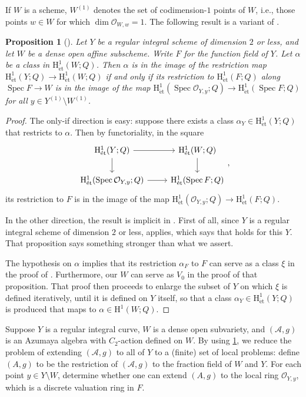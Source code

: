 \documentclass[reqno,oneside,dvipsnames,pdfnames,final]{amsart}
\newtheorem{prop}[thm]{Proposition}
\theoremstyle{definition}
\DeclareMathOperator{\Spec}{Spec}
\newcommand{\et}{\mathrm{\acute et}}
\newcommand{\sh}[1]{\mathcal{#1}}
\newcommand{\Hoh}{\mathrm{H}}
\newcommand{\sm}{\setminus}
\begin{document}
If $W$ is a scheme, $W^{(1)}$ denotes the set of codimension-$1$ points of $W$, i.e., those points $w \in W$ for which $\dim \sh O_{W,w}=1$. The following result is a variant of \cite[Cor.\ 6.14]{Colliot-Thelene1979}.



\begin{prop}[{\cite{Colliot-Thelene1979}}]\label{pr:CTS}
  Let $Y$ be a regular integral scheme of dimension $2$ or less, and let $W$ be a dense open affine subscheme. Write $F$ for the function field of $Y$. Let $\alpha$ be a class in $\Hoh^1_\et(W; Q)$. Then $\alpha$ is in the image of the restriction map $\Hoh^1_\et(Y; Q) \to \Hoh^1_\et(W; Q)$ if and only if its restriction to $\Hoh^1_\et(F; Q)$ along $\Spec F \to W$ is in the image of the map $\Hoh^1_\et(\Spec \sh O_{Y,y}; Q)  \to \Hoh^1_\et(\Spec F; Q)$ for all $y \in Y^{(1)}\sm W^{(1)}$.
\end{prop}
\begin{proof}
  The only-if direction is easy: suppose there exists a class $\alpha_Y \in \Hoh^1_\et(Y; Q)$ that restricts to $\alpha$. Then by functoriality, in the square
  \[
    \begin{tikzcd}
      \Hoh^1_\et(Y;Q) \rar \dar & \Hoh^1_\et(W;Q) \dar \\
      \Hoh^1_\et(\Spec \sh O_{Y,y}; Q) \rar & \Hoh^1_\et(\Spec F; Q) 
    \end{tikzcd},
  \] its restriction to $F$ is in the image of the map $\Hoh^1_\et(\sh O_{Y,y}; Q) \to \Hoh^1_\et(F; Q)$.
  
In the other direction, the result is implicit in \cite[\S6]{Colliot-Thelene1979}. First of all, since $Y$ is a regular integral scheme of dimension $2$ or less, \cite[Cor.~6.13]{Colliot-Thelene1979} applies, which says that \cite[Prop.~6.8]{Colliot-Thelene1979} holds for this $Y$. That proposition says something stronger than what we assert.

The hypothesis on $\alpha$ implies that its restriction $\alpha_F$ to $F$ can serve as a class $\xi$ in the proof of \cite[Prop.~6.8]{Colliot-Thelene1979}. Furthermore, our $W$ can serve as $V_0$ in the proof of that proposition. That proof then proceeds to enlarge the subset of $Y$ on which $\xi$ is defined iteratively, until it is defined on $Y$ itself, so that a class $\alpha_Y \in \Hoh^1_\et(Y;Q)$ is produced that maps to $\alpha \in \Hoh^1(W;Q)$.
\end{proof}

Suppose $Y$ is a regular integral curve, $W$ is a dense open subvariety, and $(\sh A,g)$ is an Azumaya algebra with $C_2$-action defined on $W$. By using \ref{pr:CTS}, we reduce the problem of extending $(\sh A, g)$ to all of $Y$ to a (finite) set of local problems: define $(A,g)$ to be the restriction of $(\sh A, g)$ to the fraction field of $W$ and $Y$. For each point $y \in Y\sm W$, determine whether one can extend $(A,g)$ to the local ring $\sh O_{Y,y}$, which is a discrete valuation ring in $F$.
\end{document}
